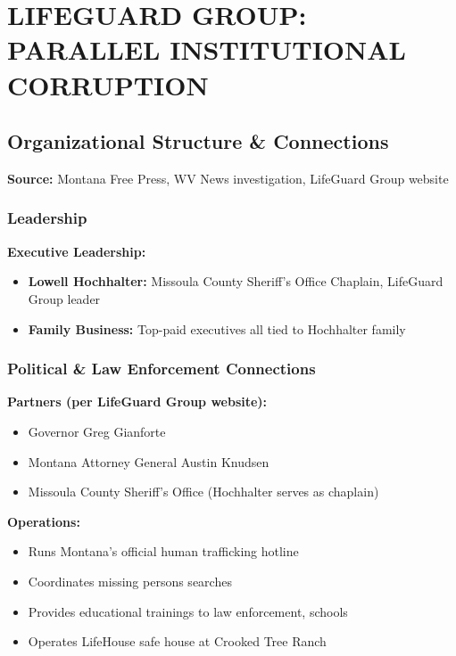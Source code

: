 \documentclass[11pt,letterpaper]{article}
\begin{document}
\section{LIFEGUARD GROUP: PARALLEL INSTITUTIONAL CORRUPTION}

\subsection{Organizational Structure \& Connections}

\textbf{Source:} Montana Free Press, WV News investigation, LifeGuard Group website

\subsubsection{Leadership}

\textbf{Executive Leadership:}
\begin{itemize}[leftmargin=*]
\item \textbf{Lowell Hochhalter:} Missoula County Sheriff's Office Chaplain, LifeGuard Group leader
\item \textbf{Family Business:} Top-paid executives all tied to Hochhalter family
\end{itemize}

\subsubsection{Political \& Law Enforcement Connections}

\textbf{Partners (per LifeGuard Group website):}
\begin{itemize}[leftmargin=*]
\item Governor Greg Gianforte
\item Montana Attorney General Austin Knudsen
\item Missoula County Sheriff's Office (Hochhalter serves as chaplain)
\end{itemize}

\textbf{Operations:}
\begin{itemize}[leftmargin=*]
\item Runs Montana's official human trafficking hotline
\item Coordinates missing persons searches
\item Provides educational trainings to law enforcement, schools
\item Operates LifeHouse safe house at Crooked Tree Ranch
\end{itemize}
\end{document}
